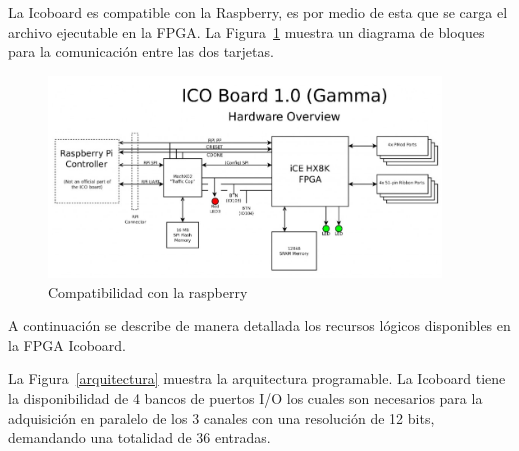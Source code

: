  

La Icoboard es compatible con la Raspberry, es por medio de esta que se carga el archivo ejecutable en la FPGA. La Figura~\ref{Compatilidad} muestra un diagrama de bloques para la comunicación entre las dos tarjetas. 

\begin{figure}[h]
\includegraphics[width=0.93\textwidth]{Figs/icogama.PNG} 
\centering
\caption{Compatibilidad con la raspberry~\citep{IcoBoard}}
\label{Compatilidad}
\end{figure}



A continuación se describe de manera detallada los recursos lógicos disponibles en la FPGA Icoboard.

La Figura~\ref{arquitectura}  muestra la arquitectura programable. La Icoboard tiene la disponibilidad de 4 bancos de puertos I/O los cuales son necesarios para la adquisición en paralelo de los 3 canales con una resolución de 12 bits, demandando una totalidad de 36 entradas. %


